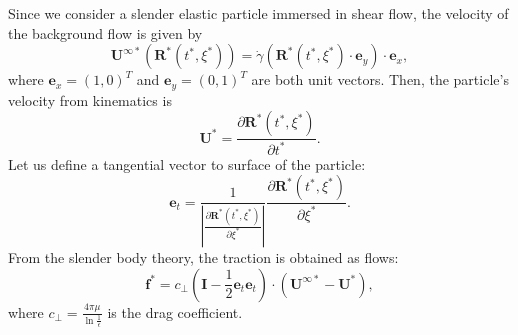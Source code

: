 \documentclass[a4paper,12pt]{article}
\begin{document}
Since we consider a slender elastic particle immersed in shear flow, the velocity of the background flow is given by
\begin{equation}
	\label{eqn:21}
	\mathbf{U}^{\infty*}(\mathbf{R}^*(t^*,\xi^*))=\dot{\gamma}\left(\mathbf{R}^*(t^*,\xi^*)\cdot\mathbf{e}_y\right)\cdot\mathbf{e}_x,
\end{equation}
where $\mathbf{e}_x=(1,0)^T$ and $\mathbf{e}_y=(0,1)^T$ are both unit vectors. Then, the particle's velocity from kinematics is 
\begin{equation}
	\label{eqn:22}
	\mathbf{U}^*=\frac{\partial\mathbf{R}^*(t^*,\xi^*)}{\partial t^*}.
\end{equation}
Let us define a tangential vector to surface of the particle:
\begin{equation}
	\label{eqn:23}
	\mathbf{e}_t=\frac{1}{|\frac{\partial\mathbf{R}^*(t^*,\xi^*)}{\partial\xi^*}|}\frac{\partial\mathbf{R}^*(t^*,\xi^*)}{\partial\xi^*}.
\end{equation}
From the slender body theory, the traction is obtained as flows:
\begin{equation}
	\label{eqn:24}
	\mathbf{f}^*=c_\perp\left(\mathbf{I}-\frac{1}{2}\mathbf{e}_t\mathbf{e}_t\right)\cdot(\mathbf{U}^{\infty*}-\mathbf{U}^*),
\end{equation}
where $c_\perp=\frac{4\pi\mu}{\ln{\frac{1}{\epsilon}}}$ is the drag coefficient. 
\end{document}
